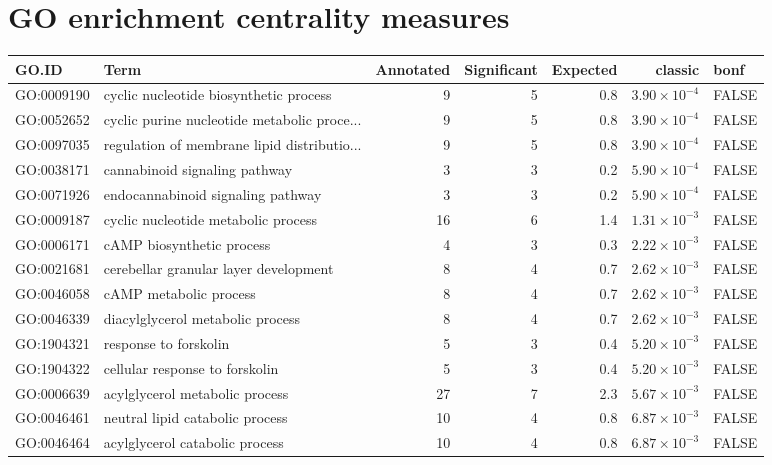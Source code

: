 \section{GO enrichment centrality measures}
\begin{table}[ht]
\centering
\begin{adjustbox}{max width=\textwidth}
\begin{tabular}{llrrrrl}
  \hline
GO.ID & Term & Annotated & Significant & Expected & classic & bonf \\ 
  \hline
GO:0009190 & cyclic nucleotide biosynthetic process & 9 & 5 & 0.8 & $3.90 \times 10^{-4}$ & FALSE \\ 
  GO:0052652 & cyclic purine nucleotide metabolic proce... & 9 & 5 & 0.8 & $3.90 \times 10^{-4}$ & FALSE \\ 
  GO:0097035 & regulation of membrane lipid distributio... & 9 & 5 & 0.8 & $3.90 \times 10^{-4}$ & FALSE \\ 
  GO:0038171 & cannabinoid signaling pathway & 3 & 3 & 0.2 & $5.90 \times 10^{-4}$ & FALSE \\ 
  GO:0071926 & endocannabinoid signaling pathway & 3 & 3 & 0.2 & $5.90 \times 10^{-4}$ & FALSE \\ 
  GO:0009187 & cyclic nucleotide metabolic process & 16 & 6 & 1.4 & $1.31 \times 10^{-3}$ & FALSE \\ 
  GO:0006171 & cAMP biosynthetic process & 4 & 3 & 0.3 & $2.22 \times 10^{-3}$ & FALSE \\ 
  GO:0021681 & cerebellar granular layer development & 8 & 4 & 0.7 & $2.62 \times 10^{-3}$ & FALSE \\ 
  GO:0046058 & cAMP metabolic process & 8 & 4 & 0.7 & $2.62 \times 10^{-3}$ & FALSE \\ 
  GO:0046339 & diacylglycerol metabolic process & 8 & 4 & 0.7 & $2.62 \times 10^{-3}$ & FALSE \\ 
  GO:1904321 & response to forskolin & 5 & 3 & 0.4 & $5.20 \times 10^{-3}$ & FALSE \\ 
  GO:1904322 & cellular response to forskolin & 5 & 3 & 0.4 & $5.20 \times 10^{-3}$ & FALSE \\ 
  GO:0006639 & acylglycerol metabolic process & 27 & 7 & 2.3 & $5.67 \times 10^{-3}$ & FALSE \\ 
  GO:0046461 & neutral lipid catabolic process & 10 & 4 & 0.8 & $6.87 \times 10^{-3}$ & FALSE \\ 
  GO:0046464 & acylglycerol catabolic process & 10 & 4 & 0.8 & $6.87 \times 10^{-3}$ & FALSE \\ 

\end{tabular}
\end{adjustbox}
\end{table}
